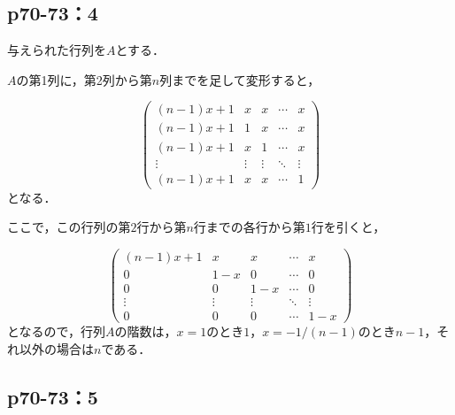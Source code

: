 \documentclass[uplatex,dvipdfmx,a4paper,10pt,fleqn]{jsarticle}
\begin{document}
\subsection*{p70-73：4}

\begin{leftbar}
    与えられた行列を$A$とする．

    $A$の第1列に，第2列から第$n$列までを足して変形すると，

    \[
        \begin{pmatrix} 
            (n-1)x+1 & x & x&  \cdots & x \\
            (n-1)x+1 & 1 & x & \cdots & x \\
            (n-1)x+1 & x & 1 &  \cdots & x \\
            \vdots & \vdots & \vdots & \ddots & \vdots \\
            (n-1)x+1 & x & x& \cdots & 1 
        \end{pmatrix}
    \]
    となる．

    ここで，この行列の第$2$行から第$n$行までの各行から第$1$行を引くと，

    \[
    \begin{pmatrix} 
        (n-1)x+1 & x & x&  \cdots & x \\
        0 & 1-x & 0 & \cdots & 0 \\
        0  & 0 & 1-x &  \cdots & 0 \\
        \vdots & \vdots & \vdots & \ddots & \vdots \\
        0 & 0 & 0& \cdots & 1 -x 
    \end{pmatrix}
    \]
    となるので，行列$A$の階数は，$x=1$のとき$1$，$ x= -1/(n-1)$のとき$n-1$，それ以外の場合は$n$である．
\end{leftbar}


    \newpage 

    \subsection*{p70-73：5}
    
\end{document}
